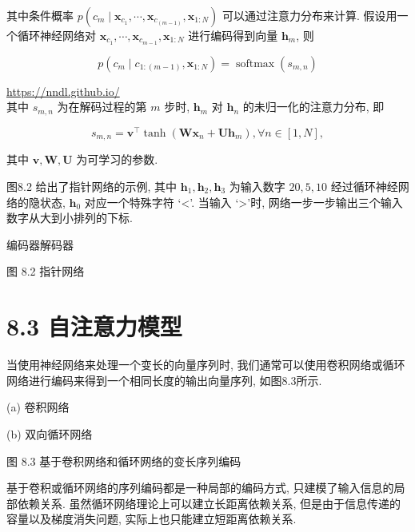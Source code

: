 \documentclass[10pt]{article}
\begin{document}
其中条件概率 $p\left(c_{m} \mid \boldsymbol{x}_{c_{1}}, \cdots, \boldsymbol{x}_{c_{(m-1)}}, \boldsymbol{x}_{1: N}\right)$ 可以通过注意力分布来计算. 假设用一个循环神经网络对 $\boldsymbol{x}_{c_{1}}, \cdots, \boldsymbol{x}_{c_{m-1}}, \boldsymbol{x}_{1: N}$ 进行编码得到向量 $\boldsymbol{h}_{m}$, 则


\begin{equation*}
p\left(c_{m} \mid c_{1:(m-1)}, \boldsymbol{x}_{1: N}\right)=\operatorname{softmax}\left(s_{m, n}\right) \tag{8.14}
\end{equation*}


\href{https://nndl.github.io/}{https://nndl.github.io/}\\
其中 $s_{m, n}$ 为在解码过程的第 $m$ 步时, $\boldsymbol{h}_{m}$ 对 $\boldsymbol{h}_{n}$ 的未归一化的注意力分布, 即


\begin{equation*}
s_{m, n}=\boldsymbol{v}^{\top} \tanh \left(\boldsymbol{W} \boldsymbol{x}_{n}+\boldsymbol{U} \boldsymbol{h}_{m}\right), \forall n \in[1, N], \tag{8.15}
\end{equation*}


其中 $\boldsymbol{v}, \boldsymbol{W}, \boldsymbol{U}$ 为可学习的参数.

图8.2 给出了指针网络的示例, 其中 $\boldsymbol{h}_{1}, \boldsymbol{h}_{2}, \boldsymbol{h}_{3}$ 为输入数字 $20,5,10$ 经过循环神经网络的隐状态, $\boldsymbol{h}_{0}$ 对应一个特殊字符 ‘<'. 当输入 ‘>’时, 网络一步一步输出三个输入数字从大到小排列的下标.



编码器解码器

图 8.2 指针网络

\section*{8.3 自注意力模型}
当使用神经网络来处理一个变长的向量序列时, 我们通常可以使用卷积网络或循环网络进行编码来得到一个相同长度的输出向量序列, 如图8.3所示.



(a) 卷积网络



(b) 双向循环网络

图 8.3 基于卷积网络和循环网络的变长序列编码

基于卷积或循环网络的序列编码都是一种局部的编码方式, 只建模了输入信息的局部依赖关系. 虽然循环网络理论上可以建立长距离依赖关系, 但是由于信息传递的容量以及梯度消失问题, 实际上也只能建立短距离依赖关系.
\end{document}

